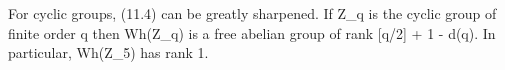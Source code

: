 For cyclic groups, (11.4) can be greatly sharpened. If Z_q is the cyclic group of finite order q then Wh(Z_q) is a free abelian group of rank [q/2] + 1 - d(q). In particular, Wh(Z_5) has rank 1.
